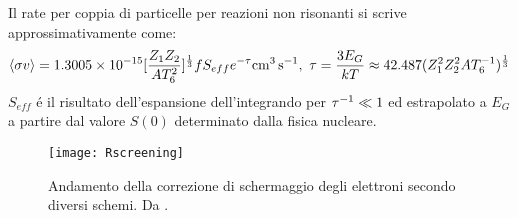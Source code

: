 \documentclass[../main.tex]{subfiles}
\begin{document}
Il rate per coppia di particelle per reazioni non risonanti si scrive approssimativamente come:
\begin{equation}
\exv{\sigma v}=\num{1.3005e-15}[\frac{Z_1Z_2}{AT_6^2}]\expy{\frac{1}{3}}fS_{eff}\exp{-\tau}\si{\cubic\cm\per\second},\ \tau=\frac{3E_G}{kT}\approx\num{42.487}(Z_1^2Z_2^2AT_6\expy{-1})\expy{\frac{1}{3}}
\end{equation}
$S_{eff}$ \'e il risultato dell'espansione dell'integrando per ${\tau}^{-1}\ll1$ ed estrapolato a $E_G$ a partire dal valore $S(0)$ determinato dalla fisica nucleare.

\begin{wrapfigure}[18]{r}{0.45\textwidth}
       \texttt{[image: Rscreening]}
       \caption{Andamento della correzione di schermaggio degli elettroni secondo diversi schemi. Da \cite{ricci1995screening}.}
\end{wrapfigure}

\begin{comment}
\begin{wraptable}[10]{r}{0.4\textwidth}\label{wrap-tab:escreening}
\pgfplotstabletypeset[
every head row/.style={
 before row={\toprule
 },
 every last row/.style={after row=\bottomrule},
 after row={\midrule}
},
every last row/.style={after row=\bottomrule},
every first column/.style={column type/.add={|}{}},
every last column/.style={column type/.add={}{|}},
display columns/0/.style={column name={}},
display columns/1/.style={column name={GB}},
display columns/2/.style={column name={GDGC}},
display columns/3/.style={column name={SVH}},
display columns/4/.style={column name={DTDL}},
create on use/react/.style={create col/set list={
$p+p$,$\cel{He}{3}{}{}+\cel{He}{4}{}{}$,$p+\cel{N}{14}{}{}$,$p+\cel{Be}{7}{}{}$}},
columns/react/.style = {column type/.add={|}{}},
columns/react/.style = {column type/.add={}{|}},
columns/react/.style={string type},
columns={react,GB,GDGC,SVH,DTDI},
/pgf/number format/precision=4
     ]{deltaSalpeter.txt} %
     \caption{Discrepanze del fattore di screening determinato da diversi autori (vedi \cite{}) $\exp{\Lambda+\delta\Lambda}$ con $\Lambda$ ricavato da Salpeter secondo lo schema accennato: i valori sono $-\delta\Lambda(\%)$.}
\end{wraptable}
\end{comment}
\end{document}
